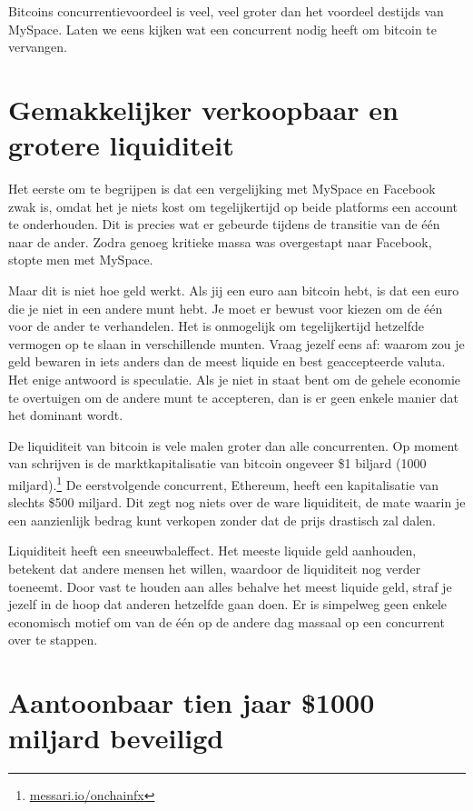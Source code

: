 \documentclass[smalldemyvopaper,11pt,twoside,onecolumn,openright,extrafontsizes]{memoir}
\begin{document}
Bitcoins concurrentievoordeel is veel, veel groter dan het voordeel destijds van MySpace. Laten we eens kijken wat een concurrent nodig heeft om bitcoin te vervangen.

\section{Gemakkelijker verkoopbaar en grotere liquiditeit}

Het eerste om te begrijpen is dat een vergelijking met MySpace en Facebook zwak is, omdat het je niets kost om tegelijkertijd op beide platforms een account te onderhouden. Dit is precies wat er gebeurde tijdens de transitie van de één naar de ander. Zodra genoeg kritieke massa was overgestapt naar Facebook, stopte men met MySpace.

Maar dit is niet hoe geld werkt. Als jij een euro aan bitcoin hebt, is dat een euro die je niet in een andere munt hebt. Je moet er bewust voor kiezen om de één voor de ander te verhandelen. Het is onmogelijk om tegelijkertijd hetzelfde vermogen op te slaan in verschillende munten. Vraag jezelf eens af: waarom zou je geld bewaren in iets anders dan de meest liquide en best geaccepteerde valuta. Het enige antwoord is speculatie. Als je niet in staat bent om de gehele economie te overtuigen om de andere munt te accepteren, dan is er geen enkele manier dat het dominant wordt. 

De liquiditeit van bitcoin is vele malen groter dan alle concurrenten. Op moment van schrijven is de marktkapitalisatie van bitcoin ongeveer \$1 biljard (1000 miljard).\footnote{\href{https://messari.io/onchainfx}{messari.io/onchainfx}} De eerstvolgende concurrent, Ethereum, heeft een kapitalisatie van slechts \$500 miljard. Dit zegt nog niets over de ware liquiditeit, de mate waarin je een aanzienlijk bedrag kunt verkopen zonder dat de prijs drastisch zal dalen. 

Liquiditeit heeft een sneeuwbaleffect. Het meeste liquide geld aanhouden, betekent dat andere mensen het willen, waardoor de liquiditeit nog verder toeneemt. Door vast te houden aan alles behalve het meest liquide geld, straf je jezelf in de hoop dat anderen hetzelfde gaan doen. Er is simpelweg geen enkele economisch motief om van de één op de andere dag massaal op een concurrent over te stappen.

\section{Aantoonbaar tien jaar \$1000 miljard beveiligd}
\end{document}
